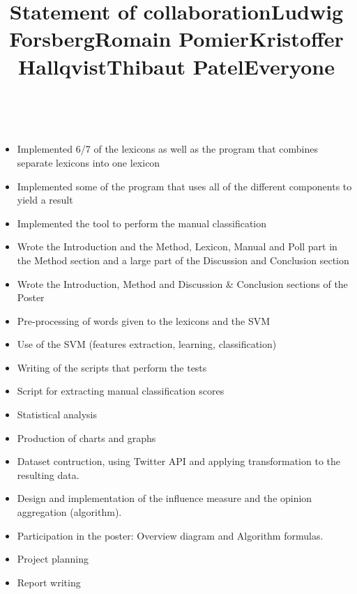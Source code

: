 \documentclass[a4paper,12pt]{report}
\begin{document}
\clearpage
\thispagestyle{empty}
\vspace*{2.15cm}
\title{\huge \textbf{Statement of collaboration}}
\vspace{1cm}\\
\title{\large \textbf{Ludwig Forsberg}}
\begin{itemize}
    \item Implemented 6/7 of the lexicons as well as the program that combines separate lexicons into one lexicon
    \item Implemented some of the program that uses all of the different components to yield a result
    \item Implemented the tool to perform the manual classification
    \item Wrote the Introduction and the Method, Lexicon, Manual and Poll part in the Method section and a large part of the Discussion and Conclusion section
    \item Wrote the Introduction, Method and Discussion \& Conclusion sections of the Poster
\end{itemize}
\title{\large \textbf{Romain Pomier}}
\begin{itemize}
  \item Pre-processing of words given to the lexicons and the SVM
  \item Use of the SVM (features extraction, learning, classification)
  \item Writing of the scripts that perform the tests
\end{itemize}
\title{\large \textbf{Kristoffer Hallqvist}}
\begin{itemize}
  \item Script for extracting manual classification scores
  \item Statistical analysis
  \item Production of charts and graphs
\end{itemize}
\title{\large \textbf{Thibaut Patel}}
\begin{itemize}
  \item Dataset contruction, using Twitter API and applying transformation to the resulting data.
  \item Design and implementation of the influence measure and the opinion aggregation (algorithm).
  \item Participation in the poster: Overview diagram and Algorithm formulas.
\end{itemize}
\title{\large \textbf{Everyone}}
\begin{itemize}
  \item Project planning
  \item Report writing
\end{itemize}
\end{document}
